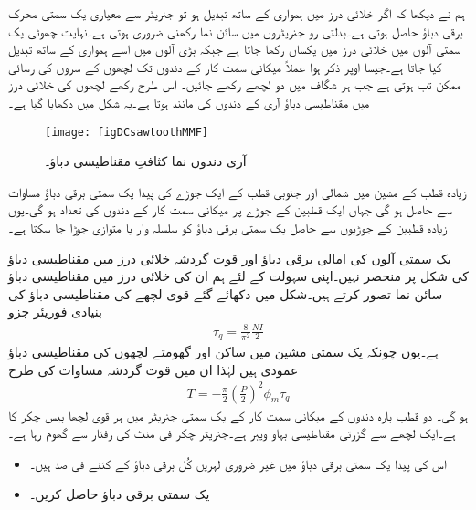 ہم نے دیکھا کہ اگر خلائی درز میں  ہمواری کے ساتھ تبدیل ہو تو جنریٹر سے معیاری یک سمتی محرک برقی دباؤ حاصل ہوتی ہے۔بدلتی رو جنریٹروں میں  سائن نما رکھنی ضروری ہوتی ہے۔نہایت چھوٹی یک سمتی آلوں میں خلائی درز میں   یکساں رکھا جاتا ہے جبکہ بڑی آلوں میں اسے ہمواری کے ساتھ تبدیل کیا جاتا ہے۔جیسا اوپر ذکر ہوا عملاً میکانی سمت کار کے دندوں تک لچھوں کے سروں کی رسائی ممکن تب ہوتی ہے جب ہر شگاف میں دو لچھے رکھے جائیں۔ اس طرح رکھے لچھوں کی خلائی درز میں مقناطیسی دباؤ آری کے دندوں کی مانند ہوتا ہے۔یہ شکل   میں دکھایا گیا ہے۔
\begin{figure}
\centering
\texttt{[image: figDCsawtoothMMF]}
\caption{آری دندوں نما کثافتِ مقناطیسی دباؤ۔}
\label{شکل_یکسمتی_آری_دندوں_نما_دباؤ}
\end{figure}

زیادہ قطب کے مشین میں شمالی اور جنوبی قطب کے ایک جوڑے کی پیدا یک سمتی برقی دباؤ مساوات   سے حاصل ہو گی جہاں  ایک قطبین کے جوڑے پر میکانی سمت کار کے دندوں کی تعداد ہو گی۔یوں زیادہ قطبین کے جوڑیوں سے حاصل یک سمتی برقی دباؤ کو سلسلہ وار یا متوازی جوڑا جا سکتا ہے۔

یک سمتی آلوں کی امالی برقی دباؤ اور قوت گردشہ خلائی درز میں مقناطیسی دباؤ کی شکل پر منحصر نہیں۔اپنی سہولت کے لئے ہم ان کی خلائی درز میں مقناطیسی دباؤ سائن نما تصور کرتے ہیں۔شکل   میں دکھائے گئے قوی لچھے کی مقناطیسی دباؤ کی بنیادی فوریئر جزو
\begin{align}
\tau_q=\frac{8}{\pi^2} \frac{N I}{2}
\end{align}
ہے۔یوں چونکہ یک سمتی مشین میں ساکن اور گھومتے لچھوں کی مقناطیسی دباؤ عمودی ہیں لہٰذا ان میں قوت گردشہ مساوات   کی طرح
\begin{align}\label{مساوات_یکسمتی_مروڑ}
T=-\frac{\pi}{2}\left( \frac{P}{2}\right)^2 \phi_m \tau_q 
\end{align} 
ہو گی۔
%
دو قطب بارہ دندوں کے میکانی سمت کار کے یک سمتی جنریٹر میں ہر قوی لچھا بیس چکر کا ہے۔ایک لچھے سے گزرتی مقناطیسی بہاو   ویبر ہے۔جنریٹر  چکر فی منٹ کی رفتار سے گھوم رہا ہے۔
\begin{itemize}
\item
اس کی پیدا یک سمتی برقی دباؤ میں غیر ضروری لہریں کُل برقی دباؤ کے کتنے فی صد ہیں۔
\item
یک سمتی برقی دباؤ حاصل کریں۔
\end{itemize}

